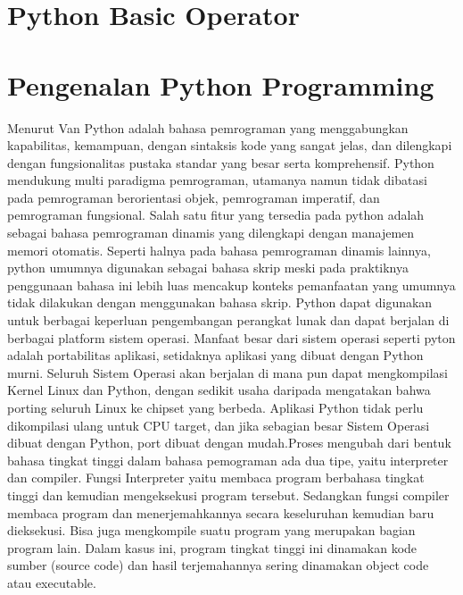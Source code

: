 
\section{Python Basic Operator}
\section{Pengenalan Python Programming}
Menurut Van Python adalah bahasa pemrograman yang menggabungkan kapabilitas, kemampuan, dengan sintaksis kode yang sangat jelas, dan dilengkapi dengan fungsionalitas pustaka standar yang besar serta komprehensif. Python mendukung multi paradigma pemrograman, utamanya namun tidak dibatasi pada pemrograman berorientasi objek, pemrograman imperatif, dan pemrograman fungsional. Salah satu fitur yang tersedia pada python adalah sebagai bahasa pemrograman dinamis yang dilengkapi dengan manajemen memori otomatis. Seperti halnya pada bahasa pemrograman dinamis lainnya, python umumnya digunakan sebagai bahasa skrip meski pada praktiknya penggunaan bahasa ini lebih luas mencakup konteks pemanfaatan yang umumnya tidak dilakukan dengan menggunakan bahasa skrip. Python dapat digunakan untuk berbagai keperluan pengembangan perangkat lunak dan dapat berjalan di berbagai platform sistem operasi. Manfaat besar dari sistem operasi seperti pyton adalah portabilitas aplikasi, setidaknya aplikasi yang dibuat dengan Python murni. Seluruh Sistem Operasi akan berjalan di mana pun dapat mengkompilasi Kernel Linux dan Python, dengan sedikit usaha daripada mengatakan bahwa porting seluruh Linux ke chipset yang berbeda. Aplikasi Python tidak perlu dikompilasi ulang untuk CPU target, dan jika sebagian besar Sistem Operasi dibuat dengan Python, port dibuat dengan mudah.Proses mengubah dari bentuk bahasa tingkat tinggi dalam bahasa pemograman ada dua tipe, yaitu interpreter dan compiler. Fungsi Interpreter yaitu membaca program berbahasa tingkat tinggi dan kemudian mengeksekusi program tersebut. Sedangkan fungsi compiler membaca program dan menerjemahkannya secara keseluruhan kemudian baru dieksekusi. Bisa juga mengkompile suatu program yang merupakan bagian program lain. Dalam kasus ini, program tingkat tinggi ini dinamakan kode sumber (source code) dan hasil terjemahannya sering dinamakan object code atau executable.  \cite{van2007python}

